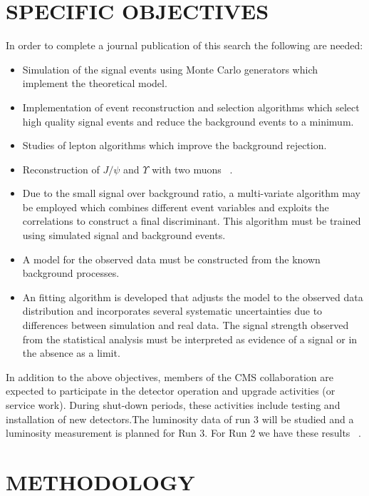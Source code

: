 \documentclass[final,3p]{CSP}
\begin{document}
\section{SPECIFIC OBJECTIVES}

\onehalfspacing 
In order to complete a journal publication of this search the following are needed:
\begin{itemize}
\item Simulation of the signal events using Monte Carlo generators which implement the theoretical model.
\item Implementation of event reconstruction and selection algorithms which select high quality signal events and reduce the background events to a minimum.
\item Studies of lepton algorithms which improve the background rejection.
\item Reconstruction of $J/\psi$ and $\Upsilon$ with two muons ~\cite{Khachatryan_2014,Sirunyan_2018}.
\item Due to the small signal over background ratio, a multi-variate algorithm may be employed which combines different event variables and exploits the correlations to construct a final discriminant. This algorithm must be trained using simulated signal and background events.
\item A model for the observed data must be constructed from the known background processes. 
\item An fitting algorithm is developed that adjusts the model to the observed data distribution and incorporates several systematic uncertainties due to differences between simulation and real data. The signal strength observed from the statistical analysis must be interpreted as evidence of a signal or in the absence as a limit. 
\end{itemize}

In addition to the above objectives, members of the CMS collaboration are expected to participate in the detector operation and upgrade activities (or service work). During shut-down periods, these activities include testing and installation of new detectors.The luminosity data of run 3 will be studied and a luminosity measurement is planned for Run 3. For Run 2 we have these results ~\cite{CMS_PAS_LUM_17_004,CMS_PAS_LUM_18_002}.

\section{METHODOLOGY}
\end{document}
